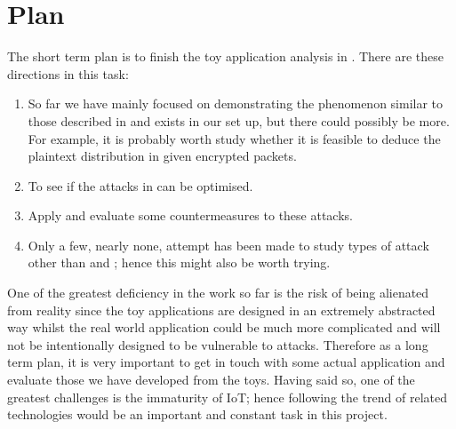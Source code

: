 \chapter{Plan}

The short term plan is to finish the toy application analysis in . There are these directions in this task:
\begin{enumerate}
\item So far we have mainly focused on demonstrating the phenomenon similar to those described in \cite{Web1} and \cite{Web2} exists in our set up, but there could possibly be more. For example, it is probably worth study whether it is feasible to deduce the plaintext distribution in  given encrypted packets.
\item To see if the attacks in  can be optimised.
\item Apply and evaluate some countermeasures to these attacks.
\item Only a few, nearly none, attempt has been made to study types of attack other than \cite{Web1} and \cite{Web2}; hence this might also be worth trying.
\end{enumerate}

One of the greatest deficiency in the work so far is the risk of being alienated from reality since the toy applications are designed in an extremely abstracted way whilst the real world application could be much more complicated and will not be intentionally designed to be vulnerable to attacks. Therefore as a long term plan, it is very important to get in touch with some actual application and evaluate those we have developed from the toys. Having said so, one of the greatest challenges is  the immaturity of IoT; hence following the trend of related technologies would be an important and constant task in this project.